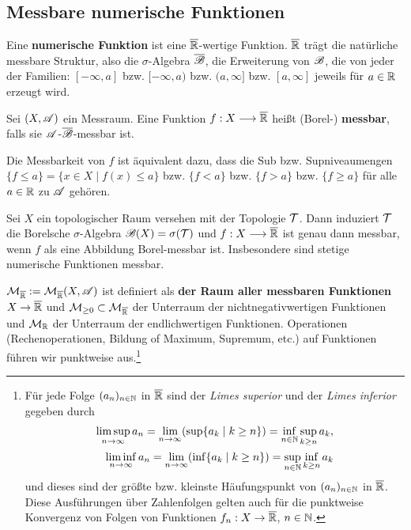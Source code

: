 \subsection{Messbare numerische Funktionen}
Eine \textbf{numerische Funktion} ist  eine $\ol\R$-wertige Funktion. $\ol\R$ trägt die natürliche messbare Struktur, also die $\sigma$-Algebra $\ol\BB$, die Erweiterung von $\BB$, die von jeder der Familien: $[-\infty,a]$ bzw. $[-\infty,a)$ bzw. $(a,\infty]$ bzw. $[a,\infty]$ jeweils für $a\in \R$ erzeugt wird.
\begin{definition}
\begin{mdframed}
Sei $(X,\AA)$ ein Messraum. Eine Funktion $f:X\longrightarrow\ol\R$ heißt (Borel-) \newline \textbf{messbar}, falls sie $\AA$-$\ol\BB$-messbar ist.
\end{mdframed}
\end{definition}
Die Messbarkeit von $f$ ist äquivalent dazu, dass die Sub bzw. Supniveaumengen $\{f\leq a\}= \{x\in X \mid f(x)\leq a \}$ bzw. $\{f<a\}$ bzw. $\{f>a\}$ bzw. $\{f\geq a\}$ für alle $a\in \R$ zu $\AA$ gehören.
\begin{example}
Sei $X$ ein topologischer Raum versehen mit der Topologie $\TT$. Dann induziert $\TT$ die Borelsche $\sigma$-Algebra $\BB(X)=\sigma(\TT)$ und $f:X \longrightarrow \ol\R$ ist genau dann messbar, wenn $f$ als eine Abbildung Borel-messbar ist. Insbesondere sind stetige numerische Funktionen messbar.
\end{example}
$\MM_{\ol\R}:=\MM_{\ol\R}(X,\AA)$ ist definiert als \textbf{der Raum aller messbaren Funktionen} $X \to \ol\R$ und $\MM_{\geq 0} \subset \MM_{\ol\R}$ der Unterraum der nichtnegativwertigen Funktionen und $\MM_{\R}$ der Unterraum der endlichwertigen Funktionen. Operationen (Rechenoperationen, Bildung of Maximum, Supremum, etc.) auf Funktionen führen wir punktweise aus.\footnote{Für jede Folge $(a_n)_{n\in\N}$ in $\ol\R$ sind der \emph{Limes superior} und der \emph{Limes inferior} gegeben durch
\begin{equation*}
\begin{split}
\limsup_{n \to \infty} a_n = \lim_{n\to\infty} (\sup \{a_k \mid k\geq n\})=\inf_{n\in\N}\sup_{k\geq n} a_k, \\
 \liminf_{n\to \infty} a_n = \lim_{n\to \infty}(\inf \{a_k \mid k\geq n\}) = \sup_{n\in\N} \inf_{k \geq n} a_k
\end{split}
\end{equation*}
und dieses sind der größte bzw. kleinste Häufungspunkt von $(a_n)_{n\in\N}$ in $\ol\R$. Diese Ausführungen über Zahlenfolgen gelten auch für die punktweise Konvergenz von Folgen von Funktionen $f_n:X\to \ol\R$, $n\in\N$. 
}

